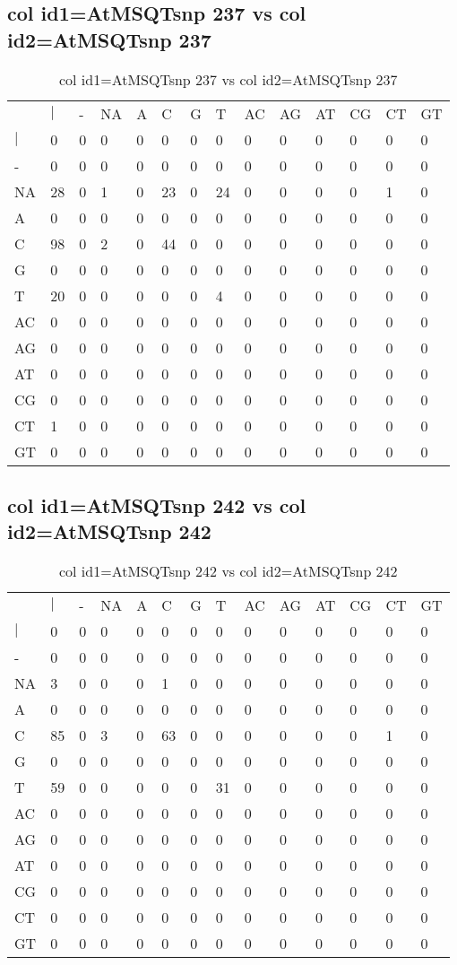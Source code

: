 \subsection{col id1=AtMSQTsnp 237 vs col id2=AtMSQTsnp 237}
\begin{center}
\begin{longtable}{|l|l|l|l|l|l|l|l|l|l|l|l|l|l|}
\caption{col id1=AtMSQTsnp 237 vs col id2=AtMSQTsnp 237} \label{table_dm602}\\
\hline
\\
\hline
&$|$&-&NA&A&C&G&T&AC&AG&AT&CG&CT&GT\\
$|$&0&0&0&0&0&0&0&0&0&0&0&0&0\\
-&0&0&0&0&0&0&0&0&0&0&0&0&0\\
NA&28&0&1&0&23&0&24&0&0&0&0&1&0\\
A&0&0&0&0&0&0&0&0&0&0&0&0&0\\
C&98&0&2&0&44&0&0&0&0&0&0&0&0\\
G&0&0&0&0&0&0&0&0&0&0&0&0&0\\
T&20&0&0&0&0&0&4&0&0&0&0&0&0\\
AC&0&0&0&0&0&0&0&0&0&0&0&0&0\\
AG&0&0&0&0&0&0&0&0&0&0&0&0&0\\
AT&0&0&0&0&0&0&0&0&0&0&0&0&0\\
CG&0&0&0&0&0&0&0&0&0&0&0&0&0\\
CT&1&0&0&0&0&0&0&0&0&0&0&0&0\\
GT&0&0&0&0&0&0&0&0&0&0&0&0&0\\
\hline
\end{longtable}
\end{center}

\subsection{col id1=AtMSQTsnp 242 vs col id2=AtMSQTsnp 242}
\begin{center}
\begin{longtable}{|l|l|l|l|l|l|l|l|l|l|l|l|l|l|}
\caption{col id1=AtMSQTsnp 242 vs col id2=AtMSQTsnp 242} \label{table_dm604}\\
\hline
\\
\hline
&$|$&-&NA&A&C&G&T&AC&AG&AT&CG&CT&GT\\
$|$&0&0&0&0&0&0&0&0&0&0&0&0&0\\
-&0&0&0&0&0&0&0&0&0&0&0&0&0\\
NA&3&0&0&0&1&0&0&0&0&0&0&0&0\\
A&0&0&0&0&0&0&0&0&0&0&0&0&0\\
C&85&0&3&0&63&0&0&0&0&0&0&1&0\\
G&0&0&0&0&0&0&0&0&0&0&0&0&0\\
T&59&0&0&0&0&0&31&0&0&0&0&0&0\\
AC&0&0&0&0&0&0&0&0&0&0&0&0&0\\
AG&0&0&0&0&0&0&0&0&0&0&0&0&0\\
AT&0&0&0&0&0&0&0&0&0&0&0&0&0\\
CG&0&0&0&0&0&0&0&0&0&0&0&0&0\\
CT&0&0&0&0&0&0&0&0&0&0&0&0&0\\
GT&0&0&0&0&0&0&0&0&0&0&0&0&0\\
\hline
\end{longtable}
\end{center}

